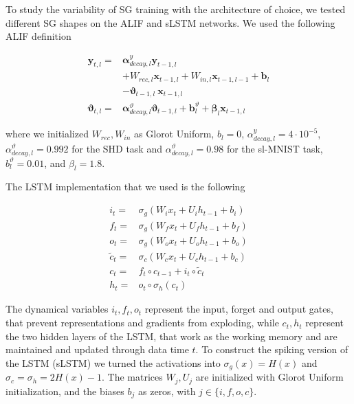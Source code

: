 To study the variability of SG training with the architecture of choice, we tested different SG shapes on the ALIF and sLSTM networks.
We used the following ALIF definition

\begin{align}    
\boldsymbol{y}_{t,l} =& \boldsymbol{\alpha}_{decay,l}^y \boldsymbol{y}_{t-1,l}  \nonumber\\ &+W_{rec,l}\boldsymbol{x}_{t-1,l}  + W_{in,l}\boldsymbol{x}_{t-1,l-1} + \boldsymbol{b}_l \nonumber\\&- \boldsymbol{\vartheta}_{t-1,l} \ \boldsymbol{x}_{t-1,l}\\
\boldsymbol{\vartheta}_{t,l} =& \boldsymbol{\alpha}^{\vartheta}_{decay,l} \boldsymbol{\vartheta}_{t-1,l} +\boldsymbol{b}^{\vartheta}_l + \boldsymbol{\beta}_l \boldsymbol{x}_{t-1,l} 
\end{align}    

\vspace{.5cm}

\noindent where we initialized $W_{rec}, W_{in}$ as Glorot Uniform, $b_l=0$, $\alpha_{decay,l}^y=4\cdot10^{-5}$,  $\alpha_{decay,l}^\vartheta=0.992$ for the SHD task and $\alpha_{decay,l}^\vartheta=0.98$ for the sl-MNIST task, $b^{\vartheta}_l =0.01$, and $\beta_l=1.8$.

The LSTM implementation that we used is the following


\begin{align}
    i_t =& \sigma_g(W_ix_t + U_ih_{t-1}+b_i)\\
    f_t =& \sigma_g(W_fx_t + U_fh_{t-1}+b_f)\\
    o_t =& \sigma_g(W_ox_t + U_oh_{t-1}+b_o)\\
    \tilde{c}_t =& \sigma_c(W_cx_t + U_ch_{t-1}+b_c)\\
    c_t =& f_t\circ c_{t-1}+ i_t\circ \tilde{c}_t\\
    h_t =& o_t\circ\sigma_h(c_t)
\end{align}

\vspace{.5cm}

The dynamical variables $i_t, f_t, o_t$ represent the input, forget and output gates, that prevent representations and gradients from exploding, while $c_t, h_t$ represent the two hidden layers of the LSTM, that work as the working memory and are maintained and updated through data time $t$.
To construct the spiking version of the LSTM (sLSTM) we turned  the activations into $\sigma_g(x)=H(x)$ and $\sigma_c=\sigma_h=2H(x)-1$. The matrices $W_j, U_j$ are initialized with Glorot Uniform initialization, and the biases $b_j$ as zeros, with $j\in\{i, f, o, c\}$.

